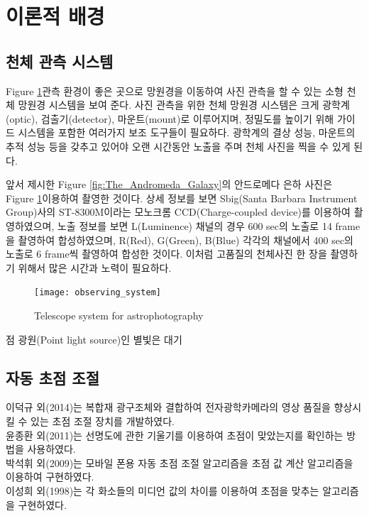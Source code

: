 \section{이론적 배경}

\subsection{천체 관측 시스템}

Figure \ref{fig:observing_system}\은 관측 환경이 좋은 곳으로 망원경을 이동하여 사진 관측을 할 수 있는 소형 천체 망원경 시스템을 보여 준다. 사진 관측을 위한 천체 망원경 시스템은 크게 광학계(optic), 검출기(detector), 마운트(mount)로 이루어지며, 정밀도를 높이기 위해 가이드 시스템을 포함한 여러가지 보조 도구들이 필요하다. 광학계의 결상 성능, 마운트의 추적 성능 등을 갖추고 있어야 오랜 시간동안 노출을 주며 천체 사진을 찍을 수 있게 된다. 

앞서 제시한 Figure \ref{fig:The_Andromeda_Galaxy}의 안드로메다 은하 사진은 Figure \ref{fig:observing_system}\을 이용하여 촬영한 것이다. 상세 정보를 보면 Sbig(Santa Barbara Instrument Group)사의  ST-8300M이라는 모노크롬 CCD(Charge-coupled device)를 이용하여 촬영하였으며, 노출 정보를 보면 L(Luminence) 채널의 경우 600 sec의 노출로 14 frame을 촬영하여 합성하였으며, R(Red), G(Green), B(Blue) 각각의 채널에서 400 sec의 노출로 6 frame씩 촬영하여 합성한 것이다. 이처럼 고품질의 천체사진 한 장을 촬영하기 위해서 많은 시간과 노력이 필요하다. 

\begin{figure}[h]
	\begin{center}
		\texttt{[image: observing\_system]}
		\caption{Telescope system for astrophotography}
		\label{fig:observing_system}
	\end{center}
\end{figure}

점 광원(Point light source)인 별빛은 대기

\subsection{자동 초점 조절}

이덕규 외(2014)는 복합재 광구조체와 결합하여 전자광학카메라의 영상 품질을 향상시킬 수 있는 초점 조절 장치를 개발하였다.\cite{leedukgu2014}\\
윤종환 외(2011)는 선명도에 관한 기울기를 이용하여 초점이 맞았는지를 확인하는 방법을 사용하였다.\cite{yunjonghwan2011lcd}\\
박석휘 외(2009)는 모바일 폰용 자동 초점 조절 알고리즘을 초점 값 계산 알고리즘을 이용하여 구현하였다.\cite{parksukhui2009Median}\\
이성희 외(1998)는 각 화소들의 미디언 값의 차이를 이용하여 초점을 맞추는 알고리즘을 구현하였다.\cite{leeseonghee1998Median}


